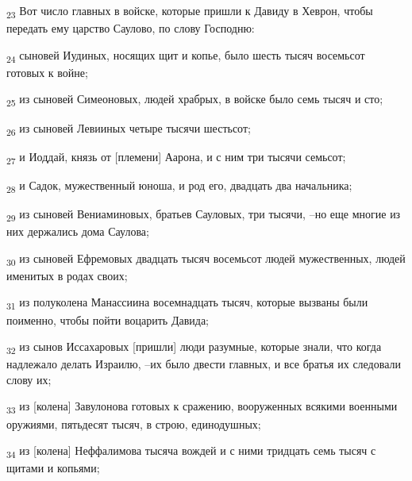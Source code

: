 \begin{tcolorbox}
\textsubscript{23} Вот число главных в войске, которые пришли к Давиду в Хеврон, чтобы передать ему царство Саулово, по слову Господню:
\end{tcolorbox}
\begin{tcolorbox}
\textsubscript{24} сыновей Иудиных, носящих щит и копье, было шесть тысяч восемьсот готовых к войне;
\end{tcolorbox}
\begin{tcolorbox}
\textsubscript{25} из сыновей Симеоновых, людей храбрых, в войске было семь тысяч и сто;
\end{tcolorbox}
\begin{tcolorbox}
\textsubscript{26} из сыновей Левииных четыре тысячи шестьсот;
\end{tcolorbox}
\begin{tcolorbox}
\textsubscript{27} и Иоддай, князь от [племени] Аарона, и с ним три тысячи семьсот;
\end{tcolorbox}
\begin{tcolorbox}
\textsubscript{28} и Садок, мужественный юноша, и род его, двадцать два начальника;
\end{tcolorbox}
\begin{tcolorbox}
\textsubscript{29} из сыновей Вениаминовых, братьев Сауловых, три тысячи, --но еще многие из них держались дома Саулова;
\end{tcolorbox}
\begin{tcolorbox}
\textsubscript{30} из сыновей Ефремовых двадцать тысяч восемьсот людей мужественных, людей именитых в родах своих;
\end{tcolorbox}
\begin{tcolorbox}
\textsubscript{31} из полуколена Манассиина восемнадцать тысяч, которые вызваны были поименно, чтобы пойти воцарить Давида;
\end{tcolorbox}
\begin{tcolorbox}
\textsubscript{32} из сынов Иссахаровых [пришли] люди разумные, которые знали, что когда надлежало делать Израилю, --их было двести главных, и все братья их следовали слову их;
\end{tcolorbox}
\begin{tcolorbox}
\textsubscript{33} из [колена] Завулонова готовых к сражению, вооруженных всякими военными оружиями, пятьдесят тысяч, в строю, единодушных;
\end{tcolorbox}
\begin{tcolorbox}
\textsubscript{34} из [колена] Неффалимова тысяча вождей и с ними тридцать семь тысяч с щитами и копьями;
\end{tcolorbox}
